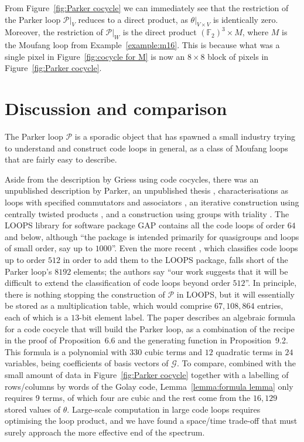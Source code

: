 \documentclass{article}
\theoremstyle{plain}
\theoremstyle{definition}
\def \cG {\mathcal{G}}
\def \cP {\mathcal{P}}
\def \FF {\mathbb{F}}
\begin{document}
From Figure~\ref{fig:Parker cocycle} we can immediately see that the restriction of the Parker loop $\cP\big|_V$ reduces to a direct product, as $\theta\big|_{V\times V}$ is identically zero. 
Moreover, the restriction of $\cP\big|_W$ is the direct product $(\FF_2)^3 \times M$, where $M$ is the Moufang loop from Example~\ref{example:m16}.
This is because what was a single pixel in Figure~\ref{fig:cocycle for M} is now an $8\times 8$ block of pixels in Figure~\ref{fig:Parker cocycle}.

\section{Discussion and comparison}

The Parker loop $\cP$ is a sporadic object that has spawned a small industry trying to understand and construct code loops in general, as a class of Moufang loops that are fairly easy to describe.

Aside from the description by Griess using code cocycles, there was an unpublished description by Parker, an unpublished thesis \cite{Johnson}, characterisations as loops with specified commutators and associators \cite{CheinGoodaire}, an iterative construction using centrally twisted products \cite{Hsu}, and a construction using groups with triality \cite{Nagy}. 
The LOOPS library \cite{LOOPS} for software package GAP \cite{GAP4} contains all the code loops of order $64$ and below, although ``the package is intended primarily for quasigroups and loops of small order, say up to $1000$''.
Even the more recent \cite{OBrien_Vojtechovsky}, which classifies code loops up to order $512$ in order to add them to the LOOPS package, falls short of the Parker loop's $8192$ elements; the authors say ``our work suggests that it will be difficult to extend the classification of code loops beyond order $512$''.
In principle, there is nothing stopping the construction of $\cP$ in LOOPS, but it will essentially be stored as a multiplication table, which would comprise $67,108,864$ entries, each of which is a $13$-bit element label.
The paper \cite{Morier-Genoud_Ovsienko} describes an algebraic formula for a code cocycle that will build the Parker loop, as a combination of the recipe in the proof of Proposition~6.6 and the generating function in Proposition~9.2.
This formula is a polynomial with $330$ cubic terms and $12$ quadratic terms in $24$ variables, being coefficients of basis vectors of $\cG$. 
To compare, combined with the small amount of data in Figure~\ref{fig:Parker cocycle} together with a labelling of rows/columns by words of the Golay code, Lemma~\ref{lemma:formula lemma} only requires 9 terms, of which four are cubic and the rest come from the $16,129$ stored values of $\theta$.
Large-scale computation in large code loops requires optimising the loop product, and we have found a space/time trade-off that must surely approach the more effective end of the spectrum.
\end{document}
